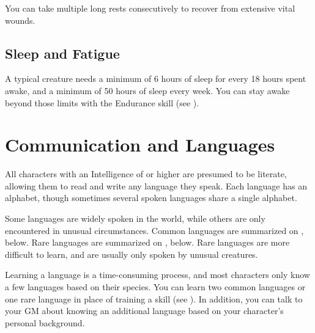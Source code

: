    You can take multiple long rests consecutively to recover from extensive vital wounds.

  \subsection{Sleep and Fatigue}\label{Sleep and Fatigue}
    A typical creature needs a minimum of 6 hours of sleep for every 18 hours spent awake, and a minimum of 50 hours of sleep every week.
    You can stay awake beyond those limits with the Endurance skill (see ).

\section{Communication and Languages}\label{Languages}\label{Communication and Languages}

  All characters with an Intelligence of  or higher are presumed to be literate, allowing them to read and write any language they speak. Each language has an alphabet, though sometimes several spoken languages share a single alphabet.

  Some languages are widely spoken in the world, while others are only encountered in unusual circumstances.
  Common languages are summarized on , below.
  Rare languages are summarized on , below.
  Rare languages are more difficult to learn, and are usually only spoken by unusual creatures.

  Learning a language is a time-consuming process, and most characters only know a few languages based on their species.
  You can learn two common languages or one rare language in place of training a skill (see ).
  In addition, you can talk to your GM about knowing an additional language based on your character's personal background.

